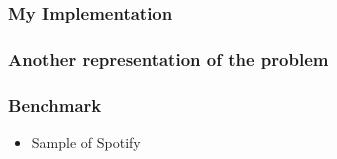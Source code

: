 \begin{frame}
  \frametitle{My Implementation}

  

\end{frame}

\begin{frame}
  \frametitle{Another representation of the problem}

  

\end{frame}

\begin{frame}
  \frametitle{Benchmark}

  \begin{itemize}
    \item Sample of Spotify
  \end{itemize}

\end{frame}
